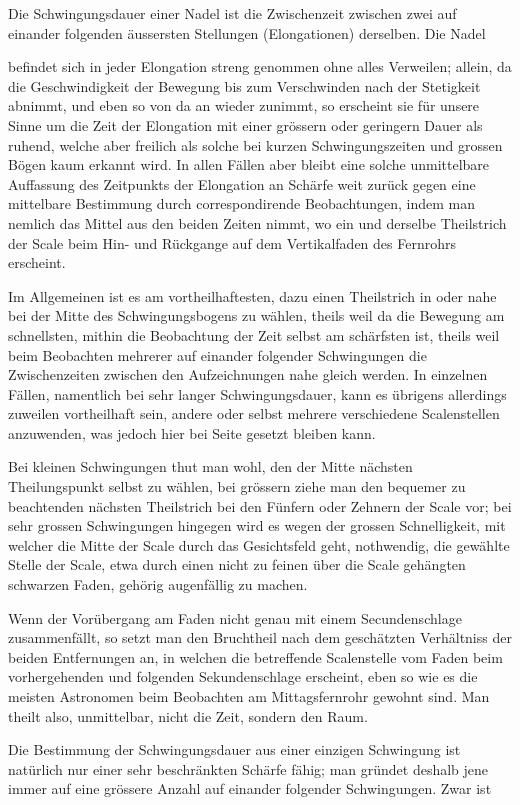 Die Schwingungsdauer einer Nadel ist die Zwischenzeit zwischen zwei auf einander folgenden äussersten Stellungen (Elongationen) derselben. Die Nadel
\par\clearpage
{}
\noindent befindet sich in jeder Elongation streng genommen ohne alles Verweilen; allein, da die Geschwindigkeit der Bewegung bis zum Verschwinden nach der Stetigkeit abnimmt, und eben so von da an wieder zunimmt, so erscheint sie für unsere Sinne um die Zeit der Elongation mit einer grössern oder geringern Dauer als ruhend, welche aber freilich als solche bei kurzen Schwingungszeiten und grossen Bögen kaum erkannt wird. In allen Fällen aber bleibt eine solche unmittelbare Auffassung des Zeitpunkts der Elongation an Schärfe weit zurück gegen eine mittelbare Bestimmung durch correspondirende Beobachtungen, indem man nemlich das Mittel aus den beiden Zeiten nimmt, wo ein und derselbe Theilstrich der Scale beim Hin- und Rückgange auf dem Vertikalfaden des Fernrohrs erscheint.

Im Allgemeinen ist es am vortheilhaftesten, dazu einen Theilstrich in oder nahe bei der Mitte des Schwingungsbogens zu wählen, theils weil da die Bewegung am schnellsten, mithin die Beobachtung der Zeit selbst am schärfsten ist, theils weil beim Beobachten mehrerer auf einander folgender Schwingungen die Zwischenzeiten zwischen den Aufzeichnungen nahe gleich werden. In einzelnen Fällen, namentlich bei sehr langer Schwingungsdauer, kann es übrigens allerdings zuweilen vortheilhaft sein, andere oder selbst mehrere verschiedene Scalenstellen anzuwenden, was jedoch hier bei Seite gesetzt bleiben kann.

Bei kleinen Schwingungen thut man wohl, den der Mitte nächsten Theilungspunkt selbst zu wählen, bei grössern ziehe man den bequemer zu beachtenden nächsten Theilstrich bei den Fünfern oder Zehnern der Scale vor; bei sehr grossen Schwingungen hingegen wird es wegen der grossen Schnelligkeit, mit welcher die Mitte der Scale durch das Gesichtsfeld geht, nothwendig, die gewählte Stelle der Scale, etwa durch einen nicht zu feinen über die Scale gehängten schwarzen Faden, gehörig augenfällig zu machen.

Wenn der Vorübergang am Faden nicht genau mit einem Secundenschlage zusammenfällt, so setzt man den Bruchtheil nach dem geschätzten Verhältniss der beiden Entfernungen an, in welchen die betreffende Scalenstelle vom Faden beim vorhergehenden und folgenden Sekundenschlage erscheint, eben so wie es die meisten Astronomen beim Beobachten am Mittagsfernrohr gewohnt sind. Man theilt also, unmittelbar, nicht die Zeit, sondern den Raum.

Die Bestimmung der Schwingungsdauer aus einer einzigen Schwingung ist natürlich nur einer sehr beschränkten Schärfe fähig; man gründet deshalb jene immer auf eine grössere Anzahl auf einander folgender Schwingungen. Zwar ist
